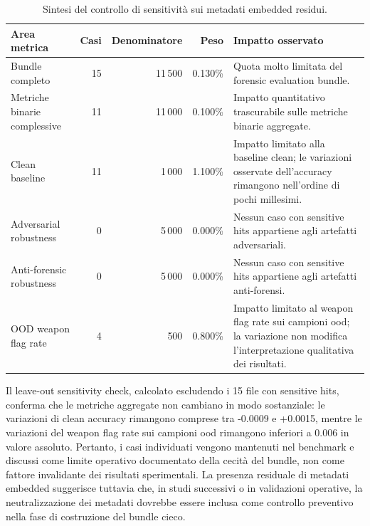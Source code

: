 \begin{table}[H]
\centering
\scriptsize
\renewcommand{\arraystretch}{1.15}
\setlength{\tabcolsep}{4pt}
\caption{Sintesi del controllo di sensitività sui metadati embedded residui.}
\label{tab:results-embedded-metadata-impact}
\begin{tabularx}{\textwidth}{@{}p{} r r r X@{}}
\toprule
\textbf{Area metrica} &
\textbf{Casi} &
\textbf{Denominatore} &
\textbf{Peso} &
\textbf{Impatto osservato} \\
\midrule

Bundle completo &
15 &
11\,500 &
0.130\% &
Quota molto limitata del forensic evaluation bundle. \\

Metriche binarie complessive &
11 &
11\,000 &
0.100\% &
Impatto quantitativo trascurabile sulle metriche binarie aggregate. \\

Clean baseline &
11 &
1\,000 &
1.100\% &
Impatto limitato alla baseline clean; le variazioni osservate dell'accuracy
rimangono nell'ordine di pochi millesimi. \\

Adversarial robustness &
0 &
5\,000 &
0.000\% &
Nessun caso con sensitive hits appartiene agli artefatti adversariali. \\

Anti-forensic robustness &
0 &
5\,000 &
0.000\% &
Nessun caso con sensitive hits appartiene agli artefatti anti-forensi. \\

OOD weapon flag rate &
4 &
500 &
0.800\% &
Impatto limitato al weapon flag rate sui campioni \gls{ood}; la variazione non
modifica l'interpretazione qualitativa dei risultati. \\

\bottomrule
\end{tabularx}
\end{table}

Il leave-out sensitivity check, calcolato escludendo i 15 file con sensitive
hits, conferma che le metriche aggregate non cambiano in modo sostanziale: le
variazioni di clean accuracy rimangono comprese tra -0.0009 e +0.0015, mentre le
variazioni del weapon flag rate sui campioni \gls{ood} rimangono inferiori a
0.006 in valore assoluto. Pertanto, i casi individuati vengono mantenuti nel
benchmark e discussi come limite operativo documentato della cecità del bundle,
non come fattore invalidante dei risultati sperimentali. La presenza residuale di
metadati embedded suggerisce tuttavia che, in studi successivi o in validazioni
operative, la neutralizzazione dei metadati dovrebbe essere inclusa come controllo
preventivo nella fase di costruzione del bundle cieco.


